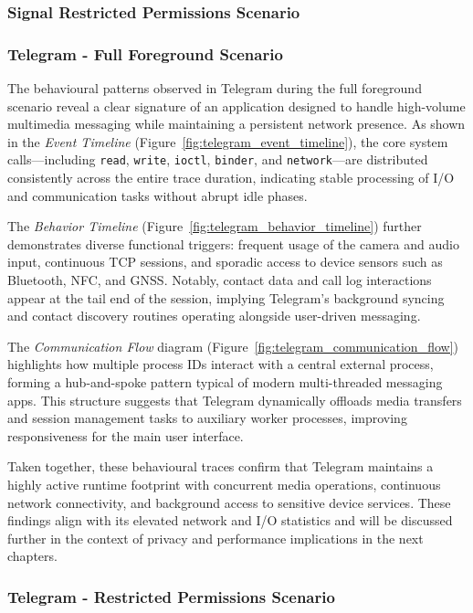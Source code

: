 \documentclass[a4paper,12pt]{report}
\begin{document}
\subsubsection{Signal Restricted Permissions Scenario}


\subsubsection{Telegram - Full Foreground Scenario}

The behavioural patterns observed in Telegram during the full foreground scenario reveal a clear signature of an application designed to handle high-volume multimedia messaging while maintaining a persistent network presence. As shown in the \textit{Event Timeline} (Figure~\ref{fig:telegram_event_timeline}), the core system calls—including \texttt{read}, \texttt{write}, \texttt{ioctl}, \texttt{binder}, and \texttt{network}—are distributed consistently across the entire trace duration, indicating stable processing of I/O and communication tasks without abrupt idle phases.

The \textit{Behavior Timeline} (Figure~\ref{fig:telegram_behavior_timeline}) further demonstrates diverse functional triggers: frequent usage of the camera and audio input, continuous TCP sessions, and sporadic access to device sensors such as Bluetooth, NFC, and GNSS. Notably, contact data and call log interactions appear at the tail end of the session, implying Telegram’s background syncing and contact discovery routines operating alongside user-driven messaging.

The \textit{Communication Flow} diagram (Figure~\ref{fig:telegram_communication_flow}) highlights how multiple process IDs interact with a central external process, forming a hub-and-spoke pattern typical of modern multi-threaded messaging apps. This structure suggests that Telegram dynamically offloads media transfers and session management tasks to auxiliary worker processes, improving responsiveness for the main user interface.

Taken together, these behavioural traces confirm that Telegram maintains a highly active runtime footprint with concurrent media operations, continuous network connectivity, and background access to sensitive device services. These findings align with its elevated network and I/O statistics and will be discussed further in the context of privacy and performance implications in the next chapters.


\subsubsection{Telegram - Restricted Permissions Scenario}
\end{document}
